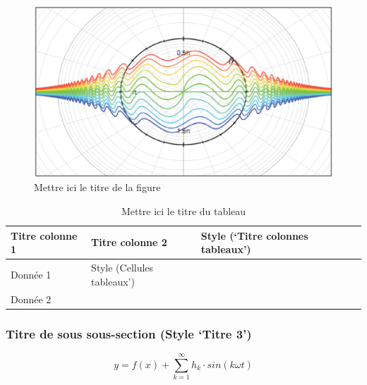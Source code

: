 \documentclass[a4paper,10pt,twocolumn]{article}
\begin{document}
\begin{figure}[!ht]
	\begin{center}
		\includegraphics[width=\columnwidth]{fig_1.eps}
	\end{center}
	
	\caption{Mettre ici le titre de la figure}
	\label{fig_1}
\end{figure}

\begin{table}[!h]
	\caption{Mettre ici le titre du tableau}
	
	\begin{center}
		\begin{tabular}{|>{\footnotesize}L{1.4cm}|>{\footnotesize}L{1.5cm}|>{\footnotesize}L{2.4cm}|>{\footnotesize}L{2.1cm}|}
			\hline
			\textbf{Titre colonne 1} & \textbf{Titre colonne 2} & \textbf{Style (‘Titre colonnes tableaux’)} & \textbf{} \\
			\hline
			Donnée 1 & Style (Cellules tableaux’) & & \\
			\hline
			Donnée 2 & & & \\
			\hline
		\end{tabular}
	\end{center}
	
	\label{tab_1}
\end{table}

\subsubsection{Titre de sous sous-section (Style ‘Titre 3’)}

\begin{equation}
	y = f(x) + \sum_{k=1}^{\infty} h_k \cdot sin(k \omega t)
	\label{eq_1}
\end{equation}
\end{document}

